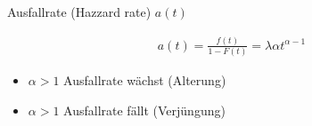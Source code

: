 \documentclass[10pt,a4paper]{article}
\begin{document}
  Ausfallrate (Hazzard rate) $a(t)$
  \begin{mdframed}[style=exercise]
    \begin{align}
        a(t) = \frac{f(t)}{1-F(t)} = \lambda \alpha t^{\alpha -1}
    \end{align}
  \end{mdframed}
  \begin{itemize}
      \item $\alpha >1$ Ausfallrate wächst (Alterung)
      \item $\alpha >1$ Ausfallrate fällt (Verjüngung)
  \end{itemize}
\end{document}
